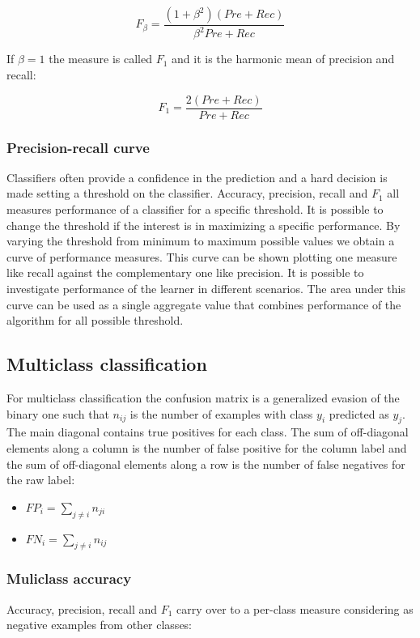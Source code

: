 		$$F_\beta = \frac{(1+\beta^2)(Pre+Rec)}{\beta^2Pre + Rec}$$

		If $\beta = 1$ the measure is called $F_1$ and it is the harmonic mean of precision and recall:

		$$F_1 = \frac{2(Pre+Rec)}{Pre+Rec}$$

		\subsubsection{Precision-recall curve}
		Classifiers often provide a confidence in the prediction and a hard decision is made setting a threshold on the classifier.
		Accuracy, precision, recall and $F_1$ all measures performance of a classifier for a specific threshold.
		It is possible to change the threshold if the interest is in maximizing a specific performance.
		By varying the threshold from minimum to maximum possible values we obtain a curve of performance measures.
		This curve can be shown plotting one measure like recall against the complementary one like precision.
		It is possible to investigate performance of the learner in different scenarios.
		The area under this curve can be used as a single aggregate value that combines performance of the algorithm for all possible threshold.

	\subsection{Multiclass classification}
	For multiclass classification the confusion matrix is a generalized evasion of the binary one such that $n_{ij}$ is the number of examples with class $y_i$ predicted as $y_j$.
	The main diagonal contains true positives for each class.
	The sum of off-diagonal elements along a column is the number of false positive for the column label and the sum of off-diagonal elements along a row is the number of false negatives for the raw label:

	\begin{multicols}{2}
		\begin{itemize}
			\item $FP_i = \sum\limits_{j\neq i} n_{ji}$
			\item $FN_i = \sum\limits_{j\neq i}n_{ij}$
		\end{itemize}
	\end{multicols}

		\subsubsection{Muliclass accuracy}
		Accuracy, precision, recall and $F_1$ carry over to a per-class measure considering as negative examples from other classes:

